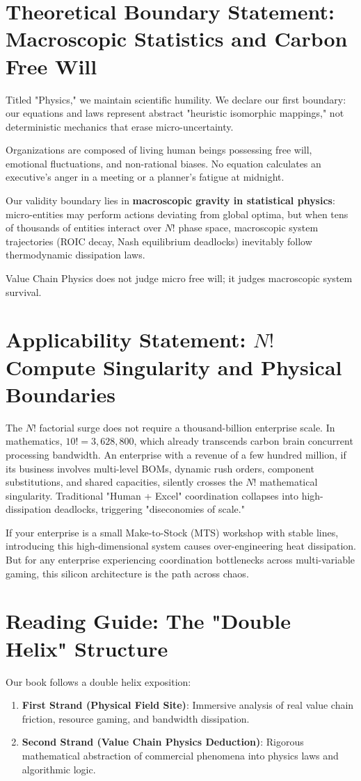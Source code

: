 \documentclass[12pt,a4paper,oneside]{book}
\begin{document}
\section*{Theoretical Boundary Statement: Macroscopic Statistics and Carbon Free Will}
Titled "Physics," we maintain scientific humility. We declare our first boundary: our equations and laws represent abstract "heuristic isomorphic mappings," not deterministic mechanics that erase micro-uncertainty.

Organizations are composed of living human beings possessing free will, emotional fluctuations, and non-rational biases. No equation calculates an executive's anger in a meeting or a planner's fatigue at midnight.

Our validity boundary lies in \textbf{macroscopic gravity in statistical physics}: micro-entities may perform actions deviating from global optima, but when tens of thousands of entities interact over $N!$ phase space, macroscopic system trajectories (ROIC decay, Nash equilibrium deadlocks) inevitably follow thermodynamic dissipation laws.

Value Chain Physics does not judge micro free will; it judges macroscopic system survival.

\section*{Applicability Statement: $N!$ Compute Singularity and Physical Boundaries}
The $N!$ factorial surge does not require a thousand-billion enterprise scale. In mathematics, $10! = 3,628,800$, which already transcends carbon brain concurrent processing bandwidth. An enterprise with a revenue of a few hundred million, if its business involves multi-level BOMs, dynamic rush orders, component substitutions, and shared capacities, silently crosses the $N!$ mathematical singularity. Traditional "Human + Excel" coordination collapses into high-dissipation deadlocks, triggering "diseconomies of scale."

If your enterprise is a small Make-to-Stock (MTS) workshop with stable lines, introducing this high-dimensional system causes over-engineering heat dissipation. But for any enterprise experiencing coordination bottlenecks across multi-variable gaming, this silicon architecture is the path across chaos.

\section*{Reading Guide: The "Double Helix" Structure}
Our book follows a double helix exposition:
\begin{enumerate}
    \item \textbf{First Strand (Physical Field Site)}: Immersive analysis of real value chain friction, resource gaming, and bandwidth dissipation.
    \item \textbf{Second Strand (Value Chain Physics Deduction)}: Rigorous mathematical abstraction of commercial phenomena into physics laws and algorithmic logic.
\end{enumerate}
\end{document}
